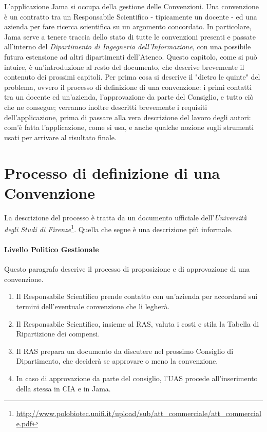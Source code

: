 L'applicazione Jama si occupa della gestione delle Convenzioni. Una convenzione è un contratto tra un Responsabile Scientifico - tipicamente un docente - ed una azienda per fare ricerca scientifica su un argomento concordato. In particolare, Jama serve a tenere traccia dello stato di tutte le convenzioni presenti e passate all'interno del \textsl{Dipartimento di Ingegneria dell'Informazione}, con una possibile futura estensione ad altri dipartimenti dell'Ateneo.\newline
Questo capitolo, come si può intuire, è un'introduzione al resto del documento, che descrive brevemente il contenuto dei prossimi capitoli.\newline
Per prima cosa si descrive il "dietro le quinte" del problema, ovvero il processo di definizione di una convenzione: i primi contatti tra un docente ed un'azienda, l'approvazione da parte del Consiglio, e tutto ciò che ne consegue; verranno inoltre descritti brevemente i requisiti dell'applicazione, prima di passare alla vera descrizione del lavoro degli autori: com'è fatta l'applicazione, come si usa, e anche qualche nozione sugli strumenti usati per arrivare al risultato finale.

\section{Processo di definizione di una Convenzione}
La descrizione del processo è tratta da un documento ufficiale dell'\textsl{Università degli Studi di Firenze}\footnote{\url{http://www.polobiotec.unifi.it/upload/sub/att_commerciale/att_commerciale.pdf}}. Quella che segue è una descrizione più informale.

\paragraph{Livello Politico Gestionale}
Questo paragrafo descrive il processo di proposizione e di approvazione di una convenzione.\newline
\begin{enumerate}
\item Il Responsabile Scientifico prende contatto con un'azienda per accordarsi sui termini dell'eventuale convenzione che li legherà.
\item
Il Responsabile Scientifico, insieme al RAS, valuta i costi e stila la Tabella di Ripartizione dei compensi.
\item Il RAS prepara un documento da discutere nel prossimo Consiglio di Dipartimento, che deciderà se approvare o meno la convenzione.
\item In caso di approvazione da parte del consiglio, l'UAS procede all'inserimento della stessa in CIA e in Jama.
\end{enumerate}
